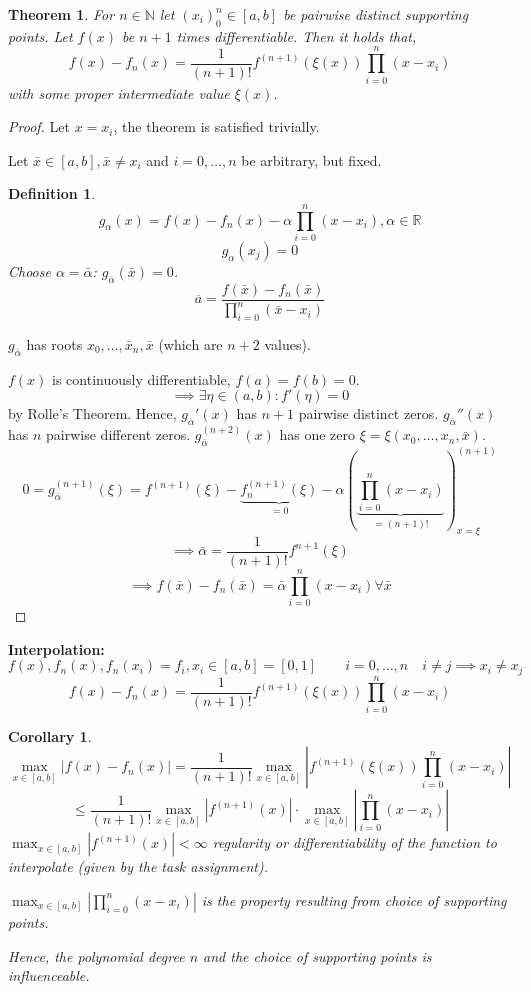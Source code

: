 \documentclass{article}
\newtheorem{theorem}{Theorem}
\newtheorem*{definition}{Definition}
\newtheorem*{corollary}{Corollary}
\newcommand{\card}[1]{\left|#1\right|}
\begin{document}
\begin{theorem}
  For $n \in \mathbb N$ let $(x_i)_0^n \in [a,b]$ be pairwise distinct supporting points.
  Let $f(x)$ be $n+1$ times differentiable. Then it holds that,
  \[ f(x) - f_n(x) = \frac{1}{(n+1)!} f^{(n+1)}(\xi(x)) \prod_{i=0}^n (x - x_i) \]
  with some proper intermediate value $\xi(x)$.
\end{theorem}

\begin{proof}
  Let $x=x_i$, the theorem is satisfied trivially.

  Let $\bar{x} \in [a,b], \bar{x} \neq x_i$ and $i = 0,\dots,n$ be arbitrary, but fixed.

  \begin{definition}
    \[ g_{\alpha}(x) = f(x) - f_n(x) - \alpha \prod_{i=0}^n (x - x_i), \alpha \in \mathbb R \]
    \[ g_\alpha(x_j) = 0 \]
    Choose $\alpha = \bar{\alpha}$: $g_{\bar{\alpha}}(\bar{x}) = 0$.
    \[ \overline{a} = \frac{f(\bar{x}) - f_n(\bar{x})}{\prod_{i=0}^n (\bar{x} - x_i)} \]
  \end{definition}
  $g_{\bar{\alpha}}$ has roots $x_0, \dots, \bar{x}_n, \bar{x}$ (which are $n+2$ values).
  
  $f(x)$ is continuously differentiable, $f(a) = f(b) = 0$.
  \[ \implies \exists \eta \in (a,b): f'(\eta) = 0 \]
  by Rolle's Theorem. Hence, $g_{\bar{\alpha}}'(x)$ has $n+1$ pairwise distinct zeros.
  $g_{\bar{\alpha}}''(x)$ has $n$ pairwise different zeros.
  $g_{\bar{\alpha}}^{(n+2)}(x)$ has one zero $\xi = \xi(x_0, \dots, x_n, \bar{x})$.
  \[
    0 = g_{\bar{\alpha}}^{(n+1)}(\xi)
    = f^{(n+1)}(\xi) - \underbrace{f_n^{(n+1)}(\xi)}_{=0}
    - \alpha\left(\underbrace{\prod_{i=0}^n (x - x_i)}_{=(n+1)!}\right)_{x=\xi}^{(n+1)}
  \] \[
    \implies \bar{\alpha} = \frac{1}{(n+1)!} f^{n+1}(\xi)
  \] \[
    \implies f(\bar{x}) - f_n(\bar{x})
    = \bar{\alpha} \prod_{i=0}^n (x - x_i) \forall \bar{x}
  \]
\end{proof}

\textbf{Interpolation:}
\[ f(x), f_n(x), f_n(x_i) = f_i, x_i \in [a,b] = [0,1] \qquad i = 0, \dots, n \quad i \neq j \implies x_i \neq x_j \]
\[ f(x) - f_n(x) = \frac{1}{(n+1)!} f^{(n+1)}(\xi(x)) \prod_{i=0}^n (x - x_i) \]

\begin{corollary}
  \[ \max_{x \in [a,b]} \card{f(x) - f_n(x)} = \frac{1}{(n+1)!} \max_{x \in [a,b]} \card{f^{(n+1)}(\xi(x)) \prod_{i=0}^n (x - x_i)} \]
  \[ \le \frac{1}{(n+1)!} \max_{x \in [a,b]} \card{f^{(n+1)}(x)} \cdot \max_{x \in [a,b]} \card{\prod_{i=0}^n (x - x_i)} \]
  $\max_{x \in [a,b]} \card{f^{(n+1)}(x)} < \infty$
  \emph{regularity} or \emph{differentiability} of the function to interpolate (given by the task assignment).

  $\max_{x \in [a,b]} \card{\prod_{i=0}^n (x - x_i)}$ is the property resulting from choice of supporting points.

  Hence, the polynomial degree $n$ and the choice of supporting points is influenceable.
\end{corollary}
\end{document}
